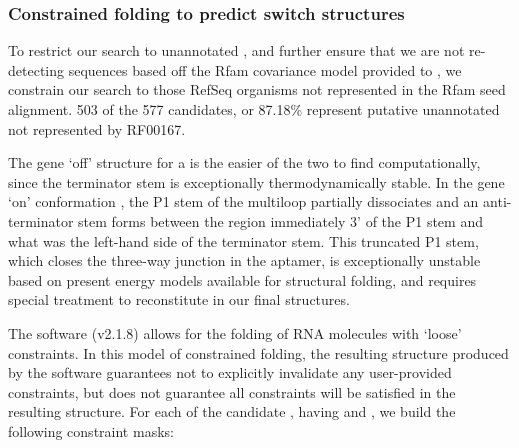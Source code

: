 \subsubsection{Constrained folding to predict switch structures}
\label{subsubsec:rfinder:consfold}

To restrict our search to unannotated \grbs, and further ensure that we are not
re-detecting sequences based off the Rfam covariance model provided to \infernal,
we constrain our search to those RefSeq organisms not represented in the Rfam seed
alignment. 503 of the 577 candidates, or 87.18\% represent putative unannotated
\rbs not represented by RF00167.

The gene `off' structure \strOff for a \grb is the easier of the two to find
computationally, since the terminator stem is exceptionally thermodynamically
stable. In the gene `on' conformation \strOn, the P1 stem of the multiloop partially
dissociates and an anti-terminator stem forms between the region immediately 3' of
the P1 stem and what was the left-hand side of the terminator stem. This truncated
P1 stem, which closes the three-way junction in the aptamer, is exceptionally
unstable based on present energy models available for structural folding, and
requires special treatment to reconstitute in our final structures.

The software \rfold (v2.1.8) allows for the folding of RNA molecules with `loose'
constraints. In this model of constrained folding, the resulting structure
produced by the software guarantees not to explicitly invalidate any user-provided
constraints, but does not guarantee all constraints will be satisfied in the
resulting structure. For each of the candidate \grbs, having \treeFor{\infernal}
and \treeFor{\tthp}, we build the following constraint masks:

